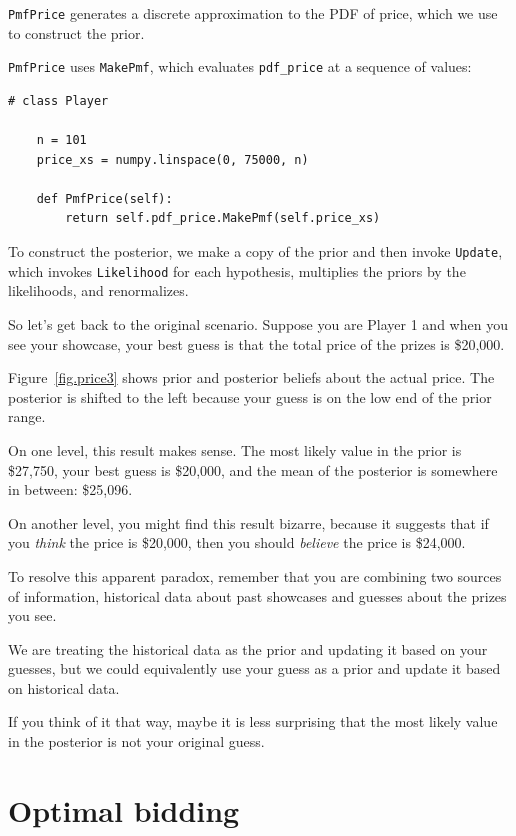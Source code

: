 \documentclass[12pt]{book}
\begin{document}
{\tt PmfPrice} generates a discrete approximation
to the PDF of price, which we use to construct the prior.

{\tt PmfPrice} uses {\tt MakePmf}, which
evaluates \verb"pdf_price" at a sequence of values:

\begin{verbatim}
# class Player

    n = 101
    price_xs = numpy.linspace(0, 75000, n)

    def PmfPrice(self):
        return self.pdf_price.MakePmf(self.price_xs)
\end{verbatim}

To construct the posterior, we make a copy of the
prior and then invoke {\tt Update}, which invokes {\tt Likelihood}
for each hypothesis, multiplies the priors by the likelihoods,
and  renormalizes.

So let's get back to the original scenario.  Suppose you are
Player 1 and when you see your showcase, your best guess is
that the total price of the prizes is \$20,000.

Figure~\ref{fig.price3} shows prior and
posterior beliefs about the actual price.
The posterior is shifted
to the left because your guess 
is on the low end of the prior range.

On one level, this result makes sense.  The most likely value
in the prior is \$27,750, your best guess is \$20,000, and
the mean of the posterior is somewhere in between: \$25,096.

On another level, you might find this result bizarre, because it
suggests that if you {\em think} the price is \$20,000, then you
should {\em believe} the price is \$24,000.

To resolve this apparent paradox, remember that you are combining two
sources of information, historical data about past showcases and
guesses about the prizes you see.

We are treating the historical data as the prior and updating it
based on your guesses, but we could equivalently use your guess
as a prior and update it based on historical data.  

If you think of it that way, maybe it is less surprising that the
most likely value in the posterior is not your original guess.


\section{Optimal bidding}
\end{document}
